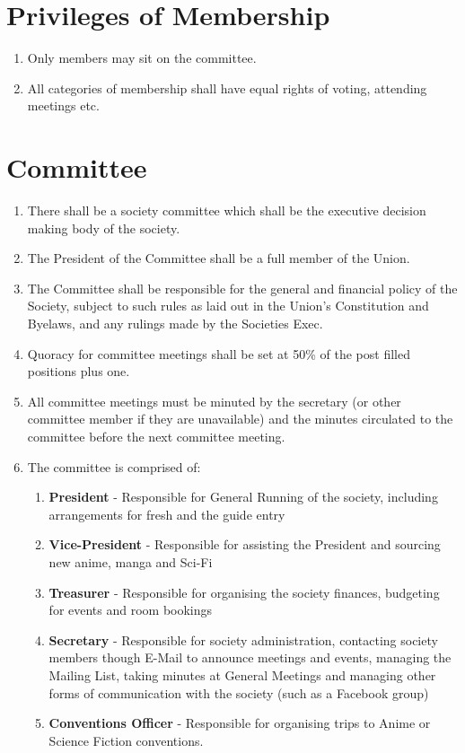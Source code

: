 \documentclass[a4paper,10pt]{article}
\begin{document}
\section{Privileges of Membership}
\begin{enumerate}
  \item Only members may sit on the committee.
  \item All categories of membership shall have equal rights of voting, attending meetings etc.
\end{enumerate}

\section{Committee}
\begin{enumerate}
  \item There shall be a society committee which shall be the executive decision making body of the society.
  \item The President of the Committee shall be a full member of the Union.
  \item The Committee shall be responsible for the general and financial policy of the Society, subject to such rules as laid out in the Union’s Constitution and Byelaws, and any rulings made by the Societies Exec.
  \item Quoracy for committee meetings shall be set at 50\% of the post filled positions plus one.
  \item All committee meetings must be minuted by the secretary (or other committee member if they are unavailable) and the minutes circulated to the committee before the next committee meeting.
  \item The committee is comprised of:
  \begin{enumerate}
    \item \textbf{President} - Responsible for General Running of the society, including arrangements for fresh and the guide entry
    \item \textbf{Vice-President} - Responsible for assisting the President and sourcing new anime, manga and Sci-Fi
    \item \textbf{Treasurer} - Responsible for organising the society finances, budgeting for events and room bookings
    \item \textbf{Secretary} - Responsible for society administration, contacting society members though E-Mail to announce meetings and events, managing the Mailing List, taking minutes at General Meetings and managing other forms of communication with the society (such as a Facebook group)
    \item \textbf{Conventions Officer} - Responsible for organising trips to Anime or Science Fiction conventions.
  \end{enumerate}
\end{enumerate}
\end{document}

